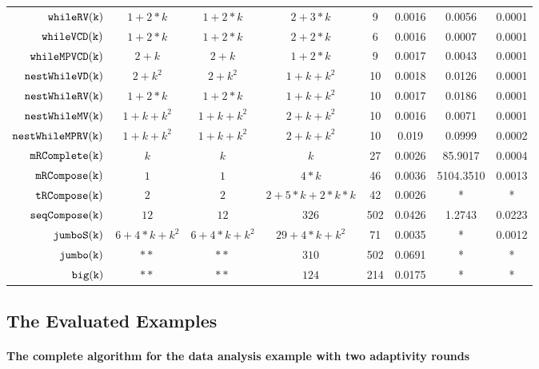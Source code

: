 {\begin {table}[H]
\begin{center}
{\begin{tabular}{ r | c | c | c | c | c | c | c  }
         $  \mathtt{whileRV(k)}$ & $1 + 2*k$ &  $1 + 2*k$ & $2 + 3 * k$  &  9 & 0.0016 & 0.0056 & 0.0001  \\
         $  \mathtt{whileVCD(k)}$ & $1 + 2*k$ &   $1 + 2 * k$ & $2 + 2 * k$  &  6 & 0.0016 & 0.0007 & 0.0001 \\
         $  \mathtt{whileMPVCD(k)}$ & $2 + k$ &  $2 + k$ & $1 + 2 * k$   &   9 & 0.0017 & 0.0043 & 0.0001 \\
         $  \mathtt{nestWhileVD(k)}$ & $2 + k^2$ &   $2 + k^2$ & $1 + k + k^2$   &  10 & 0.0018 & 0.0126 & 0.0001  \\
         $  \mathtt{nestWhileRV(k)}$ & $1 + 2*k$ &   $1 + 2*k$ &  $1 + k + k^2$   &  10 & 0.0017 & 0.0186 & 0.0001  \\
         $  \mathtt{nestWhileMV(k)}$ & $1 + k + k^2$ & $1 + k + k^2$ &  $2 + k + k^2$  & 10 & 0.0016 & 0.0071 & 0.0001 \\
         $  \mathtt{nestWhileMPRV(k)}$ & $1 + k + k^2$ &  $1 + k + k^2$ &  $2 + k + k^2$  &  10 & 0.019 & 0.0999 & 0.0002 \\
         $  \mathtt{mRComplete(k)}$ & $k$ & $k$ & $k$   &  27 & 0.0026 & 85.9017 & 0.0004 \\
         $  \mathtt{mRCompose(k)}$ & $1$ & $1$ & $4*k$   &  46 & 0.0036 & 5104.3510 &  0.0013\\
         $  \mathtt{tRCompose(k)}$ & $2$ &  $2$ & $2 + 5* k + 2 * k*k$  &  42 & 0.0026 & * & *\\
         $  \mathtt{seqCompose(k)}$ & $12$ & $12$ & $326$  &  502 & 0.0426 & 1.2743  & 0.0223 \\
         $  \mathtt{jumboS(k)}$ & $6 + 4*k + k^2$ & $6 + 4*k + k^2$ & $29 + 4*k + k^2$  &  71 & 0.0035 & * &  0.0012 \\
         $  \mathtt{jumbo(k)}$ & $**$ &  $**$ & $310$  &  502 & 0.0691 & * & * \\
         $  \mathtt{big(k)}$ & $**$ &  $**$ & $124$  &  214 & 0.0175 & * & * 
        \end{tabular}
}        
\end{center}
\end{table}
}

 \subsection{The Evaluated Examples}  
 \paragraph{The complete algorithm for the data analysis example with two adaptivity rounds} 
 

